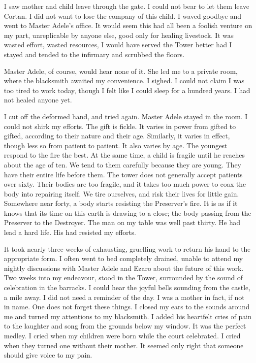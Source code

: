 \documentclass{article}
\begin{document}
I saw mother and child leave through the gate.  I could not bear to let them leave Cortan. I did not want to lose the company of this child. I waved goodbye and went to Master Adele's office. It would seem this had all been a foolish venture on my part, unreplicable by anyone else, good only for healing livestock. It was wasted effort, wasted resources, I would have served the Tower better had I stayed and tended to the infirmary and scrubbed the floors. 

Master Adele, of course, would hear none of it. She led me to a private room, where the blacksmith awaited my convenience. I sighed. I could not claim I was too tired to work today, though I felt like I could sleep for a hundred years. I had not healed anyone yet.

I cut off the deformed hand, and tried again. Master Adele stayed in the room. I could not shirk my efforts. The gift is fickle. It varies in power from gifted to gifted, according to their nature and their age. Similarly, it varies in effect, though less so from patient to patient. It also varies by age. The youngest respond to the fire the best. At the same time, a child is fragile until he reaches about the age of ten. We tend to them carefully because they are young. They have their entire life before them. The tower does not generally accept patients over sixty. Their bodies are too fragile, and it takes too much power to coax the body into repairing itself. We tire ourselves, and risk their lives for little gain. Somewhere near forty, a body starts resisting the Preserver's fire. It is as if it knows that its time on this earth is drawing to a close; the body passing from the Preserver to the Destroyer. The man on my table was well past thirty. He had lead a hard life. His had resisted my efforts.

It took nearly three weeks of exhausting, gruelling work to return his hand to the appropriate form. I often went to bed completely drained, unable to attend my nightly discussions with Master Adele and Ezaro about the future of this work. Two weeks into my endeavour, stood in the Tower, surrounded by the sound of celebration in the barracks. I could hear the joyful bells sounding from the castle, a mile away. I did not need a reminder of the day. I was a mother in fact, if not in name. One does not forget these things. I closed my ears to the sounds around me and turned my attentions to my blacksmith. I added his heartfelt cries of pain to the laughter and song from the grounds below my window. It was the perfect medley. I cried when my children were born while the court celebrated. I cried when they turned one without their mother. It seemed only right that someone should give voice to my pain. 
\end{document}
